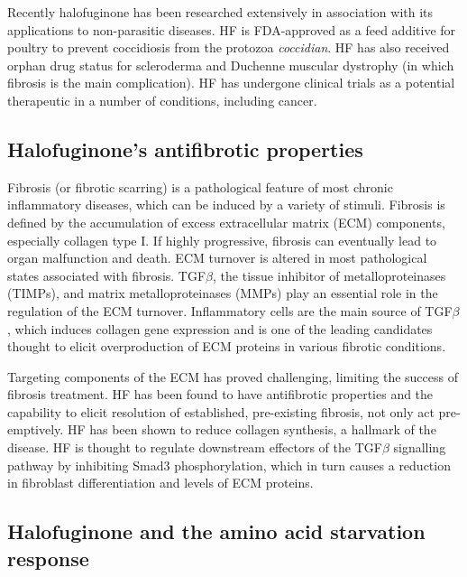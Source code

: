 Recently halofuginone has been researched extensively in association with its applications to non-parasitic diseases.
HF is FDA-approved as a feed additive for poultry to prevent coccidiosis from the protozoa \textit{coccidian}.
HF has also received orphan drug status for scleroderma and Duchenne muscular dystrophy (in which fibrosis is the main complication).
HF has undergone clinical trials as a potential therapeutic in a number of conditions, including cancer\cite{halo2012clin, halo2012clin2}.

\subsection{Halofuginone's antifibrotic properties}
Fibrosis (or fibrotic scarring) is a pathological feature of most chronic inflammatory diseases, which can be induced by a variety of stimuli\cite{wynn2012mechanisms}.
Fibrosis is defined by the accumulation of excess extracellular matrix (ECM) components, especially collagen type I.
If highly progressive, fibrosis can eventually lead to organ malfunction and death\cite{wynn2012mechanisms}.
ECM turnover is altered in most pathological states associated with fibrosis.
TGF$\beta$, the tissue inhibitor of metalloproteinases (TIMPs), and matrix metalloproteinases (MMPs) play an essential role in the regulation of the ECM turnover.
Inflammatory cells are the main source of TGF$\beta$, which induces collagen gene expression and is one of the leading candidates thought to elicit overproduction of ECM proteins in various fibrotic conditions.

Targeting components of the ECM has proved challenging, limiting the success of fibrosis treatment.
HF has been found to have antifibrotic properties and the capability to elicit resolution of established, pre-existing fibrosis, not only act pre-emptively\cite{pines1998halofuginone}.
HF has been shown to reduce collagen synthesis, a hallmark of the disease\cite{pines2001reduction}.
HF is thought to regulate downstream effectors of the TGF$\beta$ signalling pathway by inhibiting Smad3 phosphorylation, which in turn causes a reduction in fibroblast differentiation and levels of ECM proteins\cite{pines2015halofuginone}.

\subsection{Halofuginone and the amino acid starvation response}


